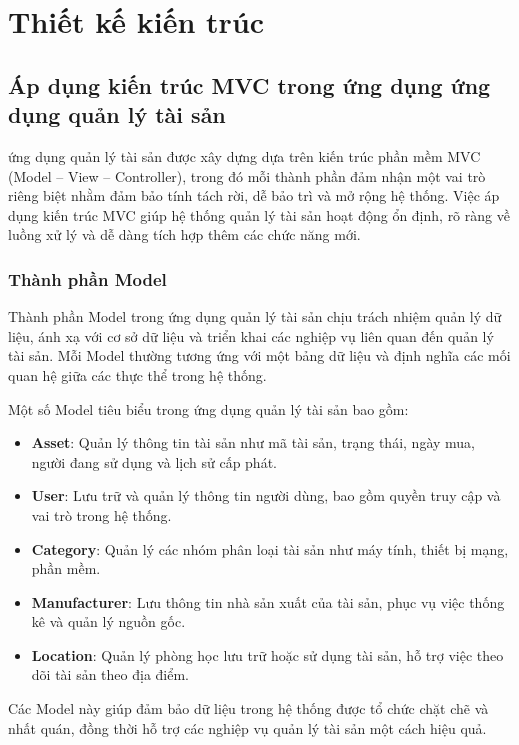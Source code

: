 \documentclass[../DoAn.tex]{subfiles}
\begin{document}
\section{Thiết kế kiến trúc}
\subsection{Áp dụng kiến trúc MVC trong ứng dụng ứng dụng quản lý tài sản}

ứng dụng quản lý tài sản được xây dựng dựa trên kiến trúc phần mềm MVC (Model -- View -- Controller),
trong đó mỗi thành phần đảm nhận một vai trò riêng biệt nhằm đảm bảo tính tách rời,
dễ bảo trì và mở rộng hệ thống. Việc áp dụng kiến trúc MVC giúp hệ thống quản lý tài sản
hoạt động ổn định, rõ ràng về luồng xử lý và dễ dàng tích hợp thêm các chức năng mới.

\subsubsection{Thành phần Model}

Thành phần Model trong ứng dụng quản lý tài sản chịu trách nhiệm quản lý dữ liệu, ánh xạ với cơ sở dữ liệu
và triển khai các nghiệp vụ liên quan đến quản lý tài sản. Mỗi Model thường tương ứng với
một bảng dữ liệu và định nghĩa các mối quan hệ giữa các thực thể trong hệ thống.

Một số Model tiêu biểu trong ứng dụng quản lý tài sản bao gồm:
\begin{itemize}
    \item \textbf{Asset}: Quản lý thông tin tài sản như mã tài sản, trạng thái, ngày mua,
    người đang sử dụng và lịch sử cấp phát.
    \item \textbf{User}: Lưu trữ và quản lý thông tin người dùng, bao gồm quyền truy cập
    và vai trò trong hệ thống.
    \item \textbf{Category}: Quản lý các nhóm phân loại tài sản như máy tính, thiết bị mạng,
    phần mềm.
    \item \textbf{Manufacturer}: Lưu thông tin nhà sản xuất của tài sản, phục vụ việc thống kê
    và quản lý nguồn gốc.
    \item \textbf{Location}: Quản lý phòng học lưu trữ hoặc sử dụng tài sản, hỗ trợ việc theo dõi
    tài sản theo địa điểm.
\end{itemize}

Các Model này giúp đảm bảo dữ liệu trong hệ thống được tổ chức chặt chẽ và nhất quán,
đồng thời hỗ trợ các nghiệp vụ quản lý tài sản một cách hiệu quả.
\end{document}
